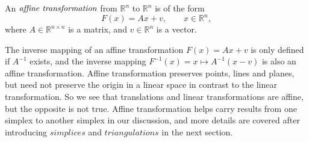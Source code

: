       \begin{definition}
      An $\emph{affine transformation}$ from $\mathbb{R}^n$ to $\mathbb{R}^n$ is of the form
      \begin{equation*}
      {F}(x) = {Ax} + {v}, \qquad {x}\in\mathbb{R}^n,
      \end{equation*}
      where ${A}\in\mathbb{R}^{n\times n}$ is a matrix, and  ${v}\in\mathbb{R}^n$ is a vector.
      \end{definition}
      The inverse mapping of an affine transformation $F(x) = Ax + v$ is only defined if $A^{-1}$ exists, and the inverse mapping $F^{-1}(x) = {x} \mapsto {A}^{-1}({x} - {v})$ is also an affine transformation.
      Affine transformation preserves points, lines and planes, but need not preserve the origin in a linear space in contrast to the linear transformation. So we see that translations and linear transformations are affine, but the opposite is not true. Affine transformation helps carry results from one simplex to another simplex in our discussion, and more details are covered after introducing $simplices$ and $triangulations$ in the next section.


